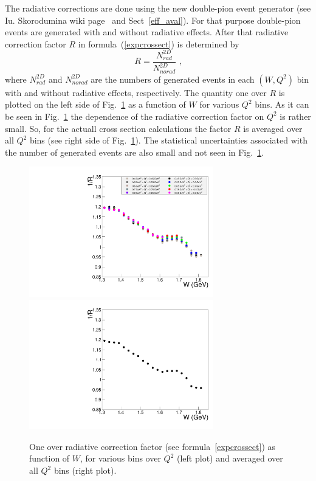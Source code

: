 The radiative corrections are done using the new double-pion event generator (see Iu. Skorodumina wiki page~\cite{Skorodum:EG} and Sect~\ref{eff_aval}). For that purpose double-pion events are generated with and without radiative effects.  After that radiative
correction factor $R$ in formula~(\ref{expcrossect})
is determined by
\begin{equation}
\label{radcorrfact}
R = \frac{N_{rad}^{2D}}{N_{norad}^{2D}} \textrm{ ,}
\end{equation}
where $N_{rad}^{2D}$ and $N_{norad}^{2D}$ are
the numbers of generated events in each $(W, Q^{2})$ bin
with and without radiative effects, respectively.
The quantity one over $R$ is plotted on the left side of Fig.~\ref{radcorrfact} as a function of $W$ for various $Q^{2}$ bins. As it can be seen in Fig.~\ref{radcorrfact} the dependence of the radiative correction factor on $Q^{2}$ is rather small. So, for the actuall cross section calculations the factor $R$ is averaged over all $Q^{2}$ bins (see right side of Fig.~\ref{radcorrfact}). The statistical uncertainties associated with the number of generated events are also small and not seen in Fig.~\ref{radcorrfact}.

\begin{figure}[htp]
\begin{center}
\includegraphics[width=8cm]{pictures/rad_corr/rad_corr_all_q2.pdf}
\includegraphics[width=8cm]{pictures/rad_corr/rad_corr_avrg.pdf}
\caption{\small One over radiative correction factor (see formula~\ref{expcrossect})
as function of $W$, for various bins over $Q^{2}$ (left plot) and averaged over all  $Q^{2}$ bins (right plot).} \label{radcorrfact}
\end{center}
\end{figure}


